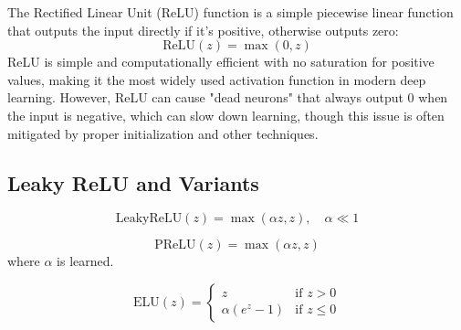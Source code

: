 The Rectified Linear Unit (ReLU) function is a simple piecewise linear function that outputs the input directly if it's positive, otherwise outputs zero:
\begin{equation}
\text{ReLU}(z) = \max(0, z)
\end{equation} ReLU is simple and computationally efficient with no saturation for positive values, making it the most widely used activation function in modern deep learning. However, ReLU can cause "dead neurons" that always output 0 when the input is negative, which can slow down learning, though this issue is often mitigated by proper initialization and other techniques.

\subsection{Leaky ReLU and Variants}

\begin{definition}
\begin{equation}
\text{LeakyReLU}(z) = \max(\alpha z, z), \quad \alpha \ll 1
\end{equation}
\end{definition}

\begin{definition}
\begin{equation}
\text{PReLU}(z) = \max(\alpha z, z)
\end{equation}
where $\alpha$ is learned.
\end{definition}

\begin{definition}
\begin{equation}
\text{ELU}(z) = \begin{cases}
z & \text{if } z > 0 \\
\alpha(e^z - 1) & \text{if } z \leq 0
\end{cases}
\end{equation}
\end{definition}

